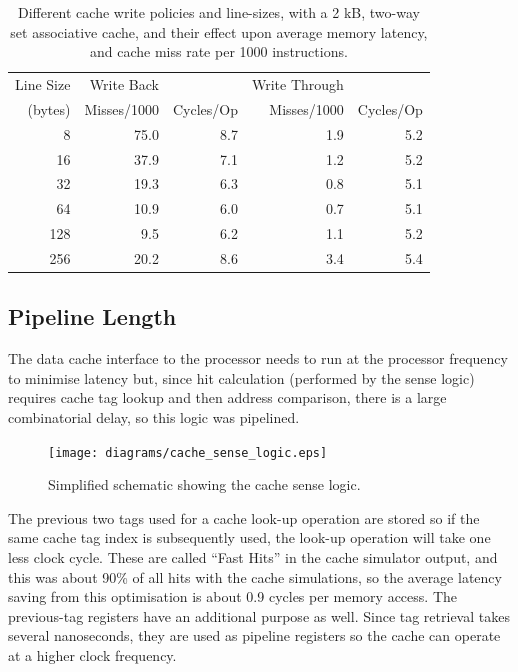 \begin{table}[h]
\begin{center}
\begin{tabular}{r | r r | r r }
Line Size & Write Back & & Write Through & \\
(bytes) & Misses/1000 & Cycles/Op & Misses/1000 & Cycles/Op \\
\hline
8   &  75.0 &  8.7 & 1.9 & 5.2 \\
16  &  37.9 &  7.1 & 1.2 & 5.2 \\
32  &  19.3 &  6.3 & 0.8 & 5.1 \\
64  &  10.9 &  6.0 & 0.7 & 5.1 \\
128 &   9.5 &  6.2 & 1.1 & 5.2 \\
256 &  20.2 &  8.6 & 3.4 & 5.4 \\
\end{tabular}
\caption[Cache Write Policies vs. Performance]{Different cache write policies
and line-sizes, with a 2 kB, two-way set associative cache, and their effect
upon average memory latency, and cache miss rate per 1000 instructions.}
\label{Write_Policy}
\end{center}
\end{table}


\subsection{Pipeline Length}
\label{CACHE_Pipeline}
The data cache interface to the processor needs to run at the processor frequency
to minimise latency but, since hit calculation (performed by the sense logic)
requires cache tag lookup and then address comparison, there is a large
combinatorial delay, so this logic was pipelined.

\begin{figure}[h!]
\begin{center}
\texttt{[image: diagrams/cache\_sense\_logic.eps]}
\caption[Simplified Schematic of the Cache Sense Logic]{Simplified schematic
showing the cache sense logic.}
\label{CACHE_Sense}
\end{center}
\end{figure}

The previous two tags used for a cache look-up operation are stored so if the
same cache tag index is subsequently used, the look-up operation will take one
less clock cycle. These are called ``Fast Hits'' in the cache simulator output,
and this was about 90\% of all hits with the cache simulations, so the average
latency saving from this optimisation is about 0.9 cycles per memory access. The
previous-tag registers have an additional purpose as well. Since tag retrieval
takes several nanoseconds, they are used as pipeline registers so the cache can
operate at a higher clock frequency.

